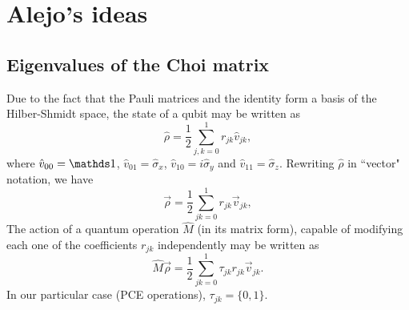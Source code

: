 \section{Alejo's ideas}
% 
\subsection{Eigenvalues of the Choi matrix}
% 
Due to the fact that the Pauli matrices and the identity form a basis of the Hilber-Shmidt space, the state of a qubit may be written as
% 
\begin{equation}
 \hat{\rho}=\frac{1}{2}\sum_{j,k=0}^1r_{jk}\hat{v}_{jk},
\end{equation}
%
where $\hat{v}_{00}=\dsone$, $\hat{v}_{01}=\hat{\sigma}_x$, $\hat{v}_{10}=i\hat{\sigma}_y$ and $\hat{v}_{11}=\hat{\sigma}_z$.
% 
Rewriting $\hat{\rho}$ in ``vector" notation, we have
%
\begin{equation}
 \vec{\rho}=\frac{1}{2}\sum_{jk=0}^1r_{jk}\vec{v}_{jk},
\end{equation}
%
The action of a quantum operation $\hat{M}$ (in its matrix form), capable of modifying each one of the coefficients $r_{jk}$ independently may be written as
%
\begin{equation}
 \hat{M}\vec{\rho}=\frac{1}{2}\sum_{jk=0}^1\tau_{jk}r_{jk}\vec{v}_{jk}.
\end{equation}
%
In our particular case (PCE operations), $\tau_{jk}=\{0,1\}$. 

